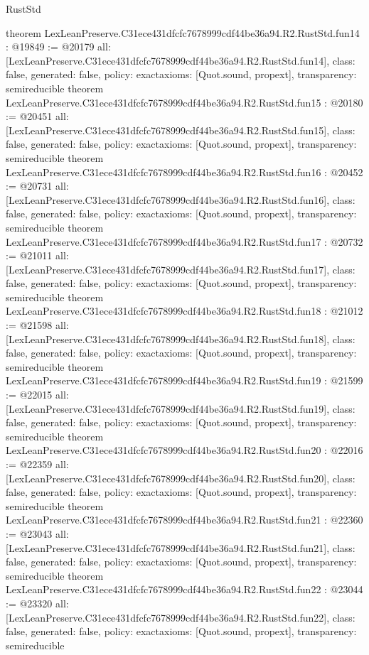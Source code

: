 \begin{lexlean}{RustStd}
\begin{coremodule}
{}
theorem LexLeanPreserve.C31ece431dfcfc7678999cdf44be36a94.R2.RustStd.fun14 : @19849 := @20179 {
  all: [LexLeanPreserve.C31ece431dfcfc7678999cdf44be36a94.R2.RustStd.fun14],
  class: false,
  generated: false,
  policy: exact{axioms: [Quot.sound, propext]},
  transparency: semireducible
}
theorem LexLeanPreserve.C31ece431dfcfc7678999cdf44be36a94.R2.RustStd.fun15 : @20180 := @20451 {
  all: [LexLeanPreserve.C31ece431dfcfc7678999cdf44be36a94.R2.RustStd.fun15],
  class: false,
  generated: false,
  policy: exact{axioms: [Quot.sound, propext]},
  transparency: semireducible
}
theorem LexLeanPreserve.C31ece431dfcfc7678999cdf44be36a94.R2.RustStd.fun16 : @20452 := @20731 {
  all: [LexLeanPreserve.C31ece431dfcfc7678999cdf44be36a94.R2.RustStd.fun16],
  class: false,
  generated: false,
  policy: exact{axioms: [Quot.sound, propext]},
  transparency: semireducible
}
theorem LexLeanPreserve.C31ece431dfcfc7678999cdf44be36a94.R2.RustStd.fun17 : @20732 := @21011 {
  all: [LexLeanPreserve.C31ece431dfcfc7678999cdf44be36a94.R2.RustStd.fun17],
  class: false,
  generated: false,
  policy: exact{axioms: [Quot.sound, propext]},
  transparency: semireducible
}
theorem LexLeanPreserve.C31ece431dfcfc7678999cdf44be36a94.R2.RustStd.fun18 : @21012 := @21598 {
  all: [LexLeanPreserve.C31ece431dfcfc7678999cdf44be36a94.R2.RustStd.fun18],
  class: false,
  generated: false,
  policy: exact{axioms: [Quot.sound, propext]},
  transparency: semireducible
}
theorem LexLeanPreserve.C31ece431dfcfc7678999cdf44be36a94.R2.RustStd.fun19 : @21599 := @22015 {
  all: [LexLeanPreserve.C31ece431dfcfc7678999cdf44be36a94.R2.RustStd.fun19],
  class: false,
  generated: false,
  policy: exact{axioms: [Quot.sound, propext]},
  transparency: semireducible
}
theorem LexLeanPreserve.C31ece431dfcfc7678999cdf44be36a94.R2.RustStd.fun20 : @22016 := @22359 {
  all: [LexLeanPreserve.C31ece431dfcfc7678999cdf44be36a94.R2.RustStd.fun20],
  class: false,
  generated: false,
  policy: exact{axioms: [Quot.sound, propext]},
  transparency: semireducible
}
theorem LexLeanPreserve.C31ece431dfcfc7678999cdf44be36a94.R2.RustStd.fun21 : @22360 := @23043 {
  all: [LexLeanPreserve.C31ece431dfcfc7678999cdf44be36a94.R2.RustStd.fun21],
  class: false,
  generated: false,
  policy: exact{axioms: [Quot.sound, propext]},
  transparency: semireducible
}
theorem LexLeanPreserve.C31ece431dfcfc7678999cdf44be36a94.R2.RustStd.fun22 : @23044 := @23320 {
  all: [LexLeanPreserve.C31ece431dfcfc7678999cdf44be36a94.R2.RustStd.fun22],
  class: false,
  generated: false,
  policy: exact{axioms: [Quot.sound, propext]},
  transparency: semireducible
}
\end{coremodule}
\end{lexlean}
